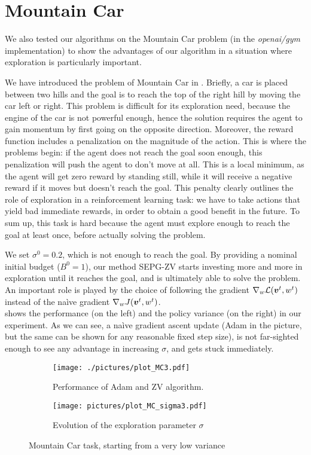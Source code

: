 \section{Mountain Car}\label{sec:mountain}

We also tested our algorithms on the Mountain Car problem (in the \textit{openai/gym} implementation) to show the advantages of our algorithm in a situation where exploration is particularly important. 

We have introduced the problem of Mountain Car in . Briefly, a car is placed between two hills and the goal is to reach the top of the right hill by moving the car left or right. This problem is difficult for its exploration need, because the engine of the car is not powerful enough, hence the solution requires the agent to gain momentum by first going on the opposite direction. Moreover, the reward function includes a penalization on the magnitude of the action. This is where the problems begin: if the agent does not reach the goal soon enough, this penalization will push the agent to don't move at all. This is a local minimum, as the agent will get zero reward by standing still, while it will receive a negative reward if it moves but doesn't reach the goal. This penalty clearly outlines the role of exploration in a reinforcement learning task: we have to take actions that yield bad immediate rewards, in order to obtain a good benefit in the future. 
To sum up, this task is hard because the agent must explore enough to reach the goal at least once, before actually solving the problem.


We set $\sigma^0 = 0.2$, which is not enough to reach the goal. By providing a nominal initial budget ($B^0 = 1$), our method SEPG-ZV starts investing more and more in exploration until it reaches the goal, and is ultimately able to solve the problem. An important role is played by the choice of following the gradient $ \nabla_{w}\mathcal{L}(\boldsymbol{v}^t, w^t)$ instead of the na\`ive gradient $\nabla_w J(\boldsymbol{v}^t, w^t)$. \\
 shows the performance (on the left) and the policy variance (on the right) in our experiment. As we can see, a na\`ive gradient ascent update (Adam in the picture, but the same can be shown for any reasonable fixed step size), is not far-sighted enough to see any advantage in increasing $\sigma$, and gets stuck immediately. 


\begin{figure}[t]
\centering
\begin{subfigure}[t]{0.49\textwidth}
\texttt{[image: ./pictures/plot\_MC3.pdf]}
\caption{Performance of Adam and ZV algorithm.}
\end{subfigure}
\begin{subfigure}[t]{0.49\textwidth}
\texttt{[image: pictures/plot\_MC\_sigma3.pdf]}
\caption{Evolution of the exploration parameter $\sigma$}
\end{subfigure}
\caption{Mountain Car task, starting from a very low variance}\label{fig:mc}
\end{figure}





